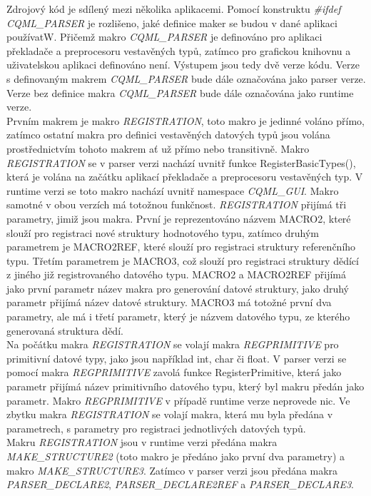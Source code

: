 \documentclass[11pt,twoside,a4paper]{book}
\begin{document}
{{\begin{ttemize}
{{\begin{lastlisting}[frame=single,caption=Řešení v pseudokódu problematického použití operátoru "." v přiřazovacím výroku,label=lst:var0N]
Zdrojový kód je sdílený mezi několika aplikacemi. Pomocí konstruktu \textit{\#ifdef CQML\_PARSER} je rozlišeno, jaké definice maker se budou v dané aplikaci používatW. Přičemž makro \textit{CQML\_PARSER} je definováno pro aplikaci překladače a preprocesoru vestavěných typů, zatímco pro grafickou knihovnu a uživatelskou aplikaci definováno není. Výstupem jsou tedy dvě verze kódu. Verze s definovaným makrem \textit{CQML\_PARSER} bude dále označována jako parser verze. Verze bez definice makra \textit{CQML\_PARSER} bude dále označována jako runtime verze.\\

Prvním makrem je makro \textit{REGISTRATION}, toto makro je jedinné voláno přímo, zatímco ostatní makra pro definici vestavěných datových typů jsou volána prostřednictvím tohoto makrem ať už přímo nebo transitivně. Makro \textit{REGISTRATION} se v parser verzi nachází uvnitř funkce RegisterBasicTypes(), která je volána na začátku aplikací překladače a preprocesoru vestavěných typ. V runtime verzi se toto makro nachází uvnitř namespace \textit{CQML}\_\textit{GUI}. Makro samotné v obou verzích má totožnou funkčnost. \textit{REGISTRATION} přijímá tři parametry, jimiž jsou makra. První je reprezentováno názvem MACRO2, které slouží pro registraci nové struktury hodnotového typu, zatímco druhým parametrem je MACRO2REF, které slouží pro registraci struktury referenčního typu. Třetím parametrem je MACRO3, což slouží pro registraci struktury dědící z jiného již registrovaného datového typu. MACRO2 a MACRO2REF přijímá jako první parametr název makra pro generování datové struktury, jako druhý parametr přijímá název datové struktury. MACRO3 má totožné první dva parametry, ale má i třetí parametr, který je názvem datového typu, ze kterého generovaná struktura dědí. \\
Na počátku makra \textit{REGISTRATION} se volají makra \textit{REGPRIMITIVE} pro primitivní datové typy, jako jsou například int, char či float. V parser verzi se pomocí makra \textit{REGPRIMITIVE} zavolá funkce RegisterPrimitive, která jako parametr přijímá název primitivního datového typu, který byl makru předán jako parametr. Makro \textit{REGPRIMITIVE} v případě runtime verze neprovede nic. Ve zbytku makra \textit{REGISTRATION} se volají makra, která mu byla předána v parametrech, s parametry pro registraci jednotlivých datových typů.\\
Makru \textit{REGISTRATION} jsou v runtime verzi předána makra \textit{MAKE\_STRUCTURE2} (toto makro je předáno jako první dva parametry) a makro \textit{MAKE\_STRUCTURE3}. Zatímco v parser verzi jsou předána makra \textit{PARSER\_DECLARE2}, \textit{PARSER\_DECLARE2REF} a \textit{PARSER\_DECLARE3}.\\

\end{lastlisting}}}
\end{ttemize}}}
\end{document}
